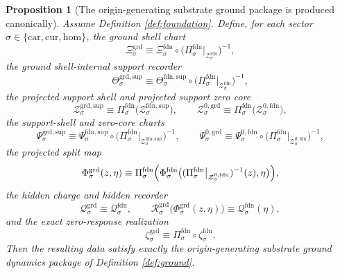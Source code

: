 \documentclass[11pt]{article}
\newcommand{\Car}{\mathrm{car}}
\newcommand{\Cur}{\mathrm{cur}}
\newcommand{\Hom}{\mathrm{hom}}
\newcommand{\GroundChart}[1]{\Xi_{#1}^{\mathrm{grd}}}
\newcommand{\GroundSupport}[1]{\Theta_{#1}^{\mathrm{grd,sup}}}
\newcommand{\GroundSupportShell}[1]{\mathcal Z_{#1}^{\mathrm{grd,sup}}}
\newcommand{\GroundZeroCore}[1]{\mathcal Z_{#1}^{0,\mathrm{grd}}}
\newcommand{\GroundEqChart}[1]{\Psi_{#1}^{\mathrm{grd,sup}}}
\newcommand{\GroundZeroChart}[1]{\Psi_{#1}^{0,\mathrm{grd}}}
\newcommand{\GroundSplit}[1]{\Phi_{#1}^{\mathrm{grd}}}
\newcommand{\GroundCharge}[1]{\mathcal Q_{#1}^{\mathrm{grd}}}
\newcommand{\GroundResidual}[1]{\mathcal R_{#1}^{\mathrm{grd}}}
\newcommand{\GroundEmbed}[1]{\zeta_{#1}^{\mathrm{grd}}}
\newcommand{\FoundProj}[1]{\Pi_{#1}^{\mathrm{fdn}}}
\newcommand{\FoundShellSet}[1]{\mathcal Z_{#1}^{\mathrm{fdn}}}
\newcommand{\FoundChart}[1]{\Xi_{#1}^{\mathrm{fdn}}}
\newcommand{\FoundSupport}[1]{\Theta_{#1}^{\mathrm{fdn,sup}}}
\newcommand{\FoundSupportShell}[1]{\mathcal Z_{#1}^{\mathrm{fdn,sup}}}
\newcommand{\FoundZeroCore}[1]{\mathcal Z_{#1}^{0,\mathrm{fdn}}}
\newcommand{\FoundEqChart}[1]{\Psi_{#1}^{\mathrm{fdn,sup}}}
\newcommand{\FoundZeroChart}[1]{\Psi_{#1}^{0,\mathrm{fdn}}}
\newcommand{\FoundSplit}[1]{\Phi_{#1}^{\mathrm{fdn}}}
\newcommand{\FoundCharge}[1]{\mathcal Q_{#1}^{\mathrm{fdn}}}
\newcommand{\FoundEmbed}[1]{\zeta_{#1}^{\mathrm{fdn}}}
\newtheorem{proposition}{Proposition}
\begin{document}
\begin{proposition}[The origin-generating substrate ground package is produced canonically]
\label{prop:ground}
Assume Definition \ref{def:foundation}. Define, for each sector \(\sigma\in\{\Car,\Cur,\Hom\}\), the ground shell chart
\begin{equation}
\GroundChart{\sigma}
\equiv
\FoundChart{\sigma}\circ
\bigl(\FoundProj{\sigma}\big|_{\FoundShellSet{\sigma}}\bigr)^{-1},
\label{eq:propinducedgroundchart}
\end{equation}
the ground shell-internal support recorder
\begin{equation}
\GroundSupport{\sigma}
\equiv
\FoundSupport{\sigma}\circ
\bigl(\FoundProj{\sigma}\big|_{\FoundShellSet{\sigma}}\bigr)^{-1},
\label{eq:propinducedgroundsupport}
\end{equation}
the projected support shell and projected support zero core
\begin{equation}
\GroundSupportShell{\sigma}
\equiv
\FoundProj{\sigma}\bigl(\FoundSupportShell{\sigma}\bigr),
\qquad
\GroundZeroCore{\sigma}
\equiv
\FoundProj{\sigma}\bigl(\FoundZeroCore{\sigma}\bigr),
\label{eq:propinducedgroundshells}
\end{equation}
the support-shell and zero-core charts
\begin{equation}
\GroundEqChart{\sigma}
\equiv
\FoundEqChart{\sigma}\circ
\bigl(\FoundProj{\sigma}\big|_{\FoundSupportShell{\sigma}}\bigr)^{-1},
\qquad
\GroundZeroChart{\sigma}
\equiv
\FoundZeroChart{\sigma}\circ
\bigl(\FoundProj{\sigma}\big|_{\FoundZeroCore{\sigma}}\bigr)^{-1},
\label{eq:propinducedgroundcharts}
\end{equation}
the projected split map
\begin{equation}
\GroundSplit{\sigma}(z,\eta)
\equiv
\FoundProj{\sigma}\Bigl(
\FoundSplit{\sigma}\bigl(
(\FoundProj{\sigma}\big|_{\FoundZeroCore{\sigma}})^{-1}(z),
\eta
\bigr)
\Bigr),
\label{eq:propinducedgroundsplit}
\end{equation}
the hidden charge and hidden recorder
\begin{equation}
\GroundCharge{\sigma}
\equiv
\FoundCharge{\sigma},
\qquad
\GroundResidual{\sigma}\bigl(\GroundSplit{\sigma}(z,\eta)\bigr)
\equiv
\FoundCharge{\sigma}(\eta),
\label{eq:propinducedgroundresidual}
\end{equation}
and the exact zero-response realization
\begin{equation}
\GroundEmbed{\sigma}
\equiv
\FoundProj{\sigma}\circ\FoundEmbed{\sigma}.
\label{eq:propinducedgroundembed}
\end{equation}
Then the resulting data satisfy exactly the origin-generating substrate ground dynamics package of Definition \ref{def:ground}.
\end{proposition}
\end{document}
